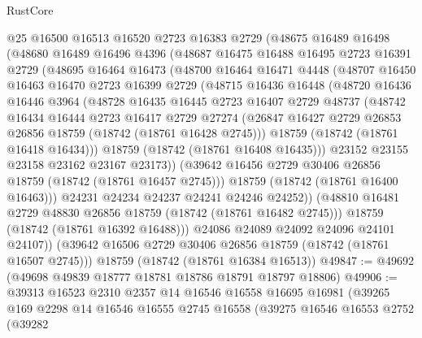 \begin{lexlean}{RustCore}
\begin{coremodule}
    @25
    @16500
    @16513
    @16520
    @2723
    @16383
    @2729
    (@48675
      @16489
      @16498
      (@48680
        @16489
        @16496
        @4396
        (@48687
          @16475
          @16488
          @16495
          @2723
          @16391
          @2729
          (@48695
            @16464
            @16473
            (@48700
              @16464
              @16471
              @4448
              (@48707
                @16450
                @16463
                @16470
                @2723
                @16399
                @2729
                (@48715
                  @16436
                  @16448
                  (@48720
                    @16436
                    @16446
                    @3964
                    (@48728
                      @16435
                      @16445
                      @2723
                      @16407
                      @2729
                      @48737
                      (@48742
                        @16434
                        @16444
                        @2723
                        @16417
                        @2729
                        @27274
                        (@26847 @16427 @2729 @26853 @26856 @18759 (@18742 (@18761 @16428 @2745)))
                        @18759
                        (@18742 (@18761 @16418 @16434)))
                      @18759
                      (@18742 (@18761 @16408 @16435)))
                    @23152
                    @23155
                    @23158
                    @23162
                    @23167
                    @23173))
                (@39642 @16456 @2729 @30406 @26856 @18759 (@18742 (@18761 @16457 @2745)))
                @18759
                (@18742 (@18761 @16400 @16463)))
              @24231
              @24234
              @24237
              @24241
              @24246
              @24252))
          (@48810 @16481 @2729 @48830 @26856 @18759 (@18742 (@18761 @16482 @2745)))
          @18759
          (@18742 (@18761 @16392 @16488)))
        @24086
        @24089
        @24092
        @24096
        @24101
        @24107))
    (@39642 @16506 @2729 @30406 @26856 @18759 (@18742 (@18761 @16507 @2745)))
    @18759
    (@18742 (@18761 @16384 @16513))
@49847 := @49692 (@49698 @49839 @18777 @18781 @18786 @18791 @18797 @18806)
@49906 := @39313
    @16523
    @2310
    @2357
    @14
    @16546
    @16558
    @16695
    @16981
    (@39265
      @169
      @2298
      @14
      @16546
      @16555
      @2745
      @16558
      (@39275
        @16546
        @16553
        @2752
        (@39282

\end{coremodule}
\end{lexlean}
